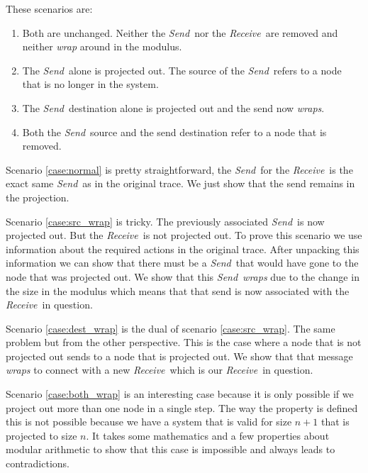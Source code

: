 \documentclass[runningheads]{llncs}
\newcommand{\send}{\emph{Send}}
\newcommand{\receive}{\emph{Receive}}
\begin{document}
These scenarios are:
\begin{enumerate}
\item \label{case:normal} Both are unchanged. Neither the \send\ nor the \receive\ are removed and neither \emph{wrap} around in the modulus.
\item \label{case:src_wrap} The \send\ alone is projected out. The source of the \send\ refers to a node that is no longer in the system.
\item \label{case:dest_wrap} The \send\ destination alone is projected out and the send now \emph{wraps}.
\item \label{case:both_wrap} Both the \send\ source and the send destination refer to a node that is removed. 
\end{enumerate}


Scenario \ref{case:normal} is pretty straightforward, the \send\ for the \receive\ is the exact same \send\ as in the original trace. We just show that the send remains in the projection.

Scenario \ref{case:src_wrap} is tricky. The previously associated \send\ is now projected out. But the \receive\ is not projected out. To prove this scenario we use information about the required actions in the original trace. After unpacking this information we can show that there must be a \send\ that would have gone to the node that was projected out. We show that this \send\ \emph{wraps} due to the change in the size in the modulus which means that that send is now associated with the \receive\ in question.

Scenario \ref{case:dest_wrap} is the dual of scenario \ref{case:src_wrap}. The same problem but from the other perspective. This is the case where a node that is not projected out sends to a node that is projected out. We show that that message \emph{wraps} to connect with a new \receive\ which is our \receive\ in question. 

Scenario \ref{case:both_wrap} is an interesting case because it is only possible if we project out more than one node in a single step. The way the property is defined this is not possible because we have a system that is valid for size $n+1$ that is projected to size $n$. It takes some mathematics and a few properties about modular arithmetic to show that this case is impossible and always leads to contradictions.

\end{document}
